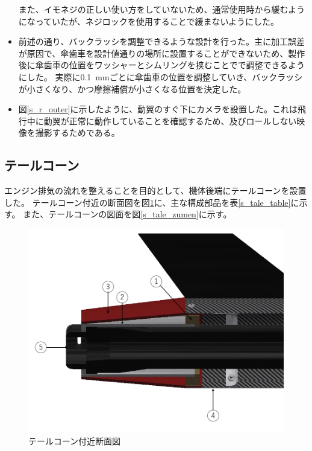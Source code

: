 \documentclass[a4paper,11pt,uplatex]{jsarticle}
\begin{document}
\begin{itemize}
	      また、イモネジの正しい使い方をしていないため、通常使用時から緩むようになっていたが、ネジロックを使用することで緩まないようにした。
	      \\
	\item 前述の通り、バックラッシを調整できるような設計を行った。主に加工誤差が原因で、傘歯車を設計値通りの場所に設置することができないため、製作後に傘歯車の位置をワッシャーとシムリングを挟むことでで調整できるようにした。
	      実際に\SI{0.1}{mm}ごとに傘歯車の位置を調整していき、バックラッシが小さくなり、かつ摩擦補償が小さくなる位置を決定した。
	      \\
	\item 図\ref{s_r_outer}に示したように、動翼のすぐ下にカメラを設置した。これは飛行中に動翼が正常に動作していることを確認するため、及びロールしない映像を撮影するためである。
\end{itemize}


\newpage
\subsection{テールコーン}
\label{tale}

エンジン排気の流れを整えることを目的として、機体後端にテールコーンを設置した。
テールコーン付近の断面図を図\ref{s_tale_num}に、主な構成部品を表\ref{s_tale_table}に示す。
また、テールコーンの図面を図\ref{s_tale_zumen}に示す。

\begin{figure}[H]
	\centering
	\includegraphics[scale = 0.4]{pic_str/s_talecorn_num.png}
	\caption{テールコーン付近断面図}
	\label{s_tale_num}
\end{figure}
\end{document}
